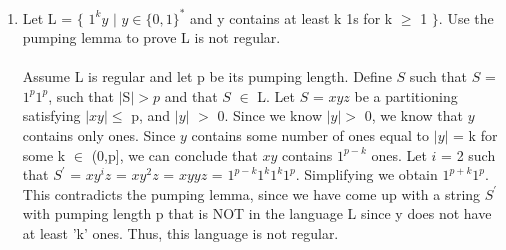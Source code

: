 \documentclass[12pt]{article}
\begin{document}
\begin{enumerate}
	\item Let L = $\{$ $1^ky$ $|$ $y \in \{0,1\}^*$ and y contains at least k 1s for k $\geq$ 1 $\}$. Use the pumping lemma to prove L is not regular. \\ \\ 
	Assume L is regular and let p be its pumping length.  Define $S$ such that $S$ = $1^p1^p$, such that $|$S$| > p$ and that $S$ $\in$ L. Let $S$ = $xyz$ be a partitioning satisfying $|xy| \leq$ p, and $|y|$ $>$ 0. Since we know $|y| >$ 0, we know that $y$ contains only ones. Since $y$ contains some number of ones equal to $|y|$ = k for some k $\in$ (0,p], we can conclude that $xy$ contains $1^{p-k}$ ones. Let $i$ = 2 such that $S^{'}$ = $xy^iz$ = $xy^2z$ = $xyyz$ = $1^{p-k}1^k1^k1^p$. Simplifying we obtain $1^{p+k}1^p$. This contradicts the pumping lemma, since we have come up with a string $S^{'}$ with pumping length p that is NOT in the language L since y does not have at least 'k' ones. Thus, this language is not regular.

\end{enumerate}
\end{document}
